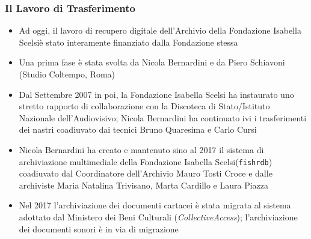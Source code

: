 \documentclass[compress,xcolor=dvipsnames]{beamer}
\newcommand{\hhref}[1]{\href{#1}{#1}}
\newcommand{\FIS}{Fondazione Isabella Scelsi\xspace}
\begin{document}
% 
% 
% 
% 

\setcounter{ms}{1}
\begin{frame}
    \frametitle{Il Lavoro di Trasferimento}

	\begin{itemize}%

    \item Ad oggi, il lavoro di recupero digitale dell'Archivio della \FIS \`e
        stato interamente finanziato dalla Fondazione stessa

    \item Una prima fase \`e stata svolta da Nicola Bernardini e da Piero
        Schiavoni (Studio Coltempo, Roma)

    \item Dal Settembre 2007 in poi, la \FIS ha instaurato uno stretto
        rapporto di collaborazione con la Discoteca di Stato/Istituto
        Nazionale dell'Audiovisivo; Nicola Bernardini ha continuato ivi i
        trasferimenti dei nastri coadiuvato dai tecnici Bruno Quaresima e
        Carlo Cursi

    \item Nicola Bernardini ha creato e mantenuto sino al 2017 il sistema
        di archiviazione multimediale della \FIS ({\tt fishrdb})  coadiuvato dal Coordinatore
        dell'Archivio Mauro Tosti Croce e dalle archiviste Maria Natalina
        Trivisano, Marta Cardillo e Laura Piazza

    \item Nel 2017 l'archiviazione dei documenti cartacei \`e stata migrata al sistema
            adottato dal Ministero dei Beni Culturali
            (\emph{CollectiveAccess}); l'archiviazione dei documenti sonori
            \`e in via di migrazione

	\end{itemize}

\end{frame}
\end{document}
